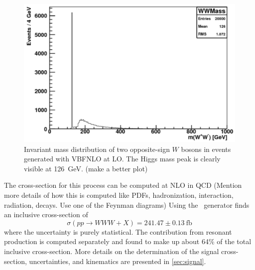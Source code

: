\begin{figure}[ht]
\centering
\includegraphics[width=0.5\columnwidth]{figures/2l2j/mWW-parton.pdf}
\caption{ Invariant mass distribution of two opposite-sign $W$ bosons 
in \www events generated with VBFNLO at LO. The Higgs mass peak is clearly 
visible at 126~GeV. (make a better plot)}
\label{fig:mww_higgs}
\end{figure}




The cross-section for this process can be computed at 
NLO in QCD
(Mention more details of how this is computed like PDFs,
hadronization, interaction, radiation, decays. Use one of the 
Feynman diagrams)
Using the \madgraph~generator finds an inclusive cross-section of 
\begin{equation}
\sigma(pp\rightarrow WWW + X) = 241.47 \pm 0.13~\textrm{fb}
\label{eq:www_total_xsec}
\end{equation}
where the uncertainty is purely statistical.
The contribution from resonant production is computed separately
and found to make up about 64\% of the 
total inclusive cross-section.
More details on the determination of the signal cross-section, uncertainties,
and kinematics are presented in \sec\ref{sec:signal}.


